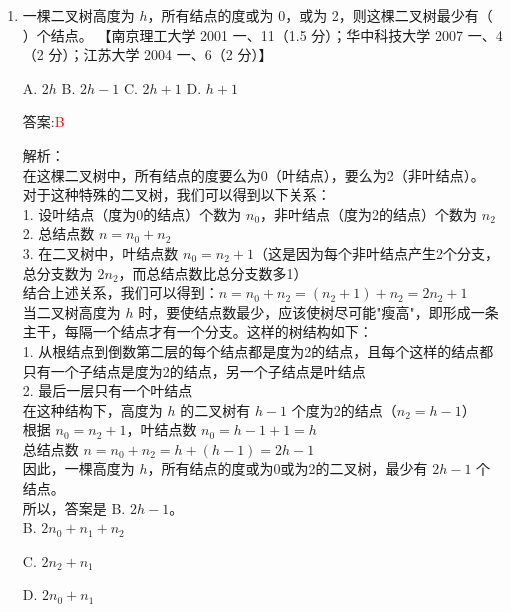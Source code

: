 \documentclass[lang=cn,newtx,10pt,scheme=chinese]{../../../elegantbook}
\begin{document}
\begin{enumerate}
    \item 一棵二叉树高度为 $h$，所有结点的度或为 0，或为 2，则这棵二叉树最少有（ ）个结点。  
    【南京理工大学 2001 一、11（1.5 分）；华中科技大学 2007 一、4（2 分）；江苏大学 2004 一、6（2 分）】  

    A. $2h$ \quad B. $2h - 1$ \quad C. ${2h+1}$ \quad D. $h + 1$  

    答案:\textcolor{red}{B}
    
    解析：\\
    在这棵二叉树中，所有结点的度要么为0（叶结点），要么为2（非叶结点）。\\
    
    对于这种特殊的二叉树，我们可以得到以下关系：\\
    1. 设叶结点（度为0的结点）个数为 $n_0$，非叶结点（度为2的结点）个数为 $n_2$\\
    2. 总结点数 $n = n_0 + n_2$\\
    3. 在二叉树中，叶结点数 $n_0 = n_2 + 1$（这是因为每个非叶结点产生2个分支，总分支数为 $2n_2$，而总结点数比总分支数多1）\\
    
    结合上述关系，我们可以得到：$n = n_0 + n_2 = (n_2 + 1) + n_2 = 2n_2 + 1$\\
    
    当二叉树高度为 $h$ 时，要使结点数最少，应该使树尽可能"瘦高"，即形成一条主干，每隔一个结点才有一个分支。这样的树结构如下：\\
    1. 从根结点到倒数第二层的每个结点都是度为2的结点，且每个这样的结点都只有一个子结点是度为2的结点，另一个子结点是叶结点\\
    2. 最后一层只有一个叶结点\\
    
    在这种结构下，高度为 $h$ 的二叉树有 $h-1$ 个度为2的结点（$n_2 = h-1$）\\
    根据 $n_0 = n_2 + 1$，叶结点数 $n_0 = h-1+1 = h$\\
    总结点数 $n = n_0 + n_2 = h + (h-1) = 2h - 1$\\
    
    因此，一棵高度为 $h$，所有结点的度或为0或为2的二叉树，最少有 $2h-1$ 个结点。\\
    
    所以，答案是 B. $2h - 1$。\\
  

    B. $2n_0 + n_1 + n_2$  

    C. $2n_2 + n_1$  

    D. $2n_0 + n_1 $  


\end{enumerate}
\end{document}
